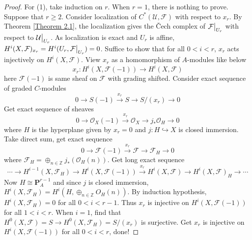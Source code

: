 \documentclass{ctexart}
\begin{document}
\begin{proof}
    \par
    For (1), take induction on $r$.
    When $r = 1$, there is nothing to prove.
    Suppose that $r \ge 2$.
    Consider localization of $C^{\ast}(\mathcal{U}, \mathcal{F})$ with respect to $x_{r}$.
    By Theorem \ref{Theorem 2.1}, the localization gives the Čech complex of $\mathcal{F}\big{|}_{U_{r}}$ with respect to $\mathcal{U}\big{|}_{U_{r}}$.
    As localization is exact and $U_{r}$ is affine, $H^{i}(X, \mathcal{F})_{x_{r}} = H^{i}(U_{r}, \mathcal{F}\big{|}_{U_{r}}) = 0$.
    Suffice to show that for all $0 < i < r$, $x_{r}$ acts injectively on $H^{i}(X, \mathcal{F})$.
    View $x_{r}$ as a homomorphism of $A$-modules like below
    \begin{equation}
        x_{r}: H^{i}(X, \mathcal{F}(-1)) \longrightarrow H^{i}(X, \mathcal{F})
    \end{equation}
    here $\mathcal{F}(-1)$ is same sheaf on $\mathcal{F}$ with grading shifted.
    Consider exact sequence of graded $C$-modules 
    \begin{equation}
        0 \longrightarrow S(-1) \overset{x_{r}}{\longrightarrow} S \longrightarrow S/(x_{r}) \longrightarrow 0
    \end{equation}
    Get exact sequence of sheaves 
    \begin{equation}
        0 \longrightarrow \mathcal{O}_{X}(-1) \overset{x_{r}}{\longrightarrow} \mathcal{O}_{X} \longrightarrow j_{\ast}\mathcal{O}_{H} \longrightarrow 0
    \end{equation}
    where $H$ is the hyperplane given by $x_{r} = 0$ and $j: H \hookrightarrow X$ is closed immersion. 
    Take direct sum, get exact sequence
    \begin{equation}
        0 \longrightarrow \mathcal{F}(-1) \overset{x_{r}}{\longrightarrow} \mathcal{F} \longrightarrow \mathcal{F}_{H} \longrightarrow 0
    \end{equation}
    where $\mathcal{F}_{H} = \oplus_{n\in \mathbb{Z}} j_{\ast}(\mathcal{O}_{H}(n))$. 
    Get long exact sequence
    \begin{equation}
        \cdots \longrightarrow H^{i - 1}(X, \mathcal{F}_{H}) \longrightarrow H^{i}(X, \mathcal{F}(-1)) \overset{x_{r}}{\longrightarrow} H^{i}(X, \mathcal{F}) \longrightarrow H^{i}(X, \mathcal{F})_{H} \longrightarrow \cdots
    \end{equation}
    Now $H \cong \mathbf{P}^{r - 1}_{A}$ and since $j$ is closed immersion, $H^{i}(X, \mathcal{F}_{H}) = H^{i}(H, \oplus_{n\in \mathbb{Z}} O_{H}(n))$.
    By induction hypothesis, $H^{i}(X, \mathcal{F}_{H}) = 0$ for all $0 < i < r - 1$.
    Thus $x_{r}$ is injective on $H^{i}(X, \mathcal{F}(-1))$ for all $1 < i < r$.
    When $i = 1$, find that $H^{0}(X, \mathcal{F}) = S \longrightarrow H^{0}(X, \mathcal{F}_{H}) = S/(x_{r})$ is surjective.
    Get $x_{r}$ is injective on $H^{i}(X, \mathcal{F}(-1))$ for all $0 < i < r$, done!
\end{proof}
\end{document}
